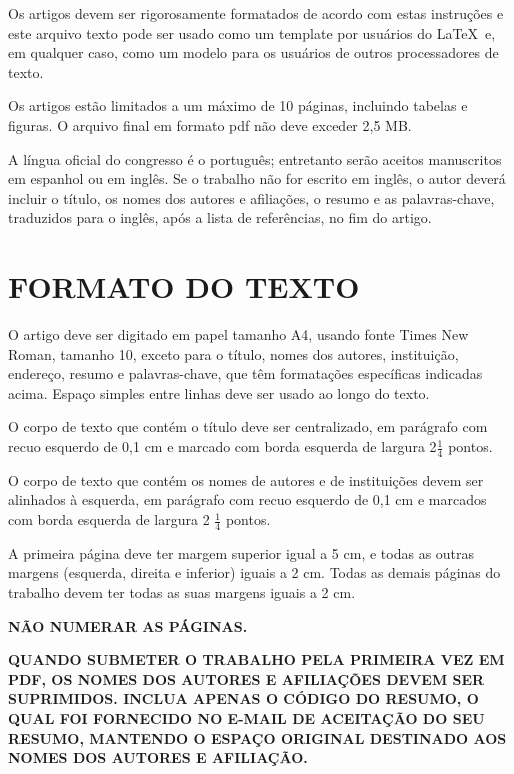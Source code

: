 \documentclass[10pt,fleqn,a4paper]{article}
\begin{document}
        Os artigos devem ser rigorosamente formatados de acordo com estas instruções e este arquivo texto pode ser usado como um template por usuários do \LaTeX\ e, em qualquer caso, como um modelo para os usuários de outros processadores de texto.

        Os artigos estão limitados a um máximo de 10 páginas, incluindo tabelas e figuras. O arquivo final em formato pdf não deve exceder 2,5 MB.

        A língua oficial do congresso é o português; entretanto serão aceitos manuscritos em espanhol ou em inglês. Se o trabalho não for escrito em inglês, o autor deverá incluir o título, os nomes dos autores e afiliações, o resumo e as palavras-chave, traduzidos para o inglês, após a lista de referências, no fim do artigo.


    \section{FORMATO DO TEXTO}
        
        O artigo deve ser digitado em papel tamanho A4, usando fonte Times New Roman, tamanho 10, exceto para o título, nomes dos autores, instituição, endereço, resumo e palavras-chave, que têm formatações específicas indicadas acima. Espaço simples entre linhas deve ser usado ao longo do texto.

        O corpo de texto que contém o título deve ser centralizado, em parágrafo com recuo esquerdo de 0,1 cm e marcado com borda esquerda de largura 2$\frac{1}{4}$ pontos.

        O corpo de texto que contém os nomes de autores e de instituições devem ser alinhados à esquerda, em parágrafo com recuo esquerdo de 0,1 cm e marcados com borda esquerda de largura 2 $\frac{1}{4}$ pontos.

        A primeira página deve ter margem superior igual a 5 cm, e todas as outras margens (esquerda, direita e inferior) iguais a 2 cm. Todas as demais páginas do trabalho devem ter todas as suas margens iguais a 2 cm.

        \textbf{\textcolor[rgb]{0.98,0.00,0.00}{NÃO NUMERAR AS PÁGINAS.}}

        \textbf{\textcolor[rgb]{1.00,0.00,0.00}{QUANDO SUBMETER O TRABALHO PELA PRIMEIRA VEZ EM PDF, OS NOMES DOS AUTORES E AFILIAÇÕES DEVEM SER SUPRIMIDOS. INCLUA APENAS O CÓDIGO DO RESUMO, O QUAL FOI FORNECIDO NO E-MAIL DE ACEITAÇÃO DO SEU RESUMO, MANTENDO O ESPAÇO ORIGINAL DESTINADO AOS NOMES DOS AUTORES E AFILIAÇÃO.}}
\end{document}
